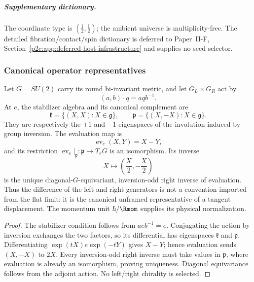 \documentclass[12pt,a4paper]{article}
\begin{document}
\subparagraph{Supplementary dictionary.}
The coordinate type is \((\tfrac12,\tfrac12)\); the ambient universe is
multiplicity-free.  The detailed fibration/contact/spin dictionary is
deferred to Paper~II-F, Section~\ref{p2c:app:deferred-host-infrastructure} and supplies
no seed selector.

\subsubsection{Canonical operator representatives}

\begin{theorem}
\label{p2:thm:canonical-transvection-bridge}
Let \(G=SU(2)\) carry its round bi-invariant metric, and let
\(G_L\times G_R\) act by
\[
        (a,b)\cdot q=aqb^{-1}.
\]
At \(e\), the stabilizer algebra and its canonical complement are
\[
 \mathfrak k=\{(X,X):X\in\mathfrak g\},
 \qquad
 \mathfrak p=\{(X,-X):X\in\mathfrak g\}.
\]
They are respectively the \(+1\) and \(-1\) eigenspaces of the involution
induced by group inversion.  The evaluation map is
\[
        \operatorname{ev}_e(X,Y)=X-Y,
\]
and its restriction \(\operatorname{ev}_e|_{\mathfrak p}:\mathfrak p\to
T_eG\) is an isomorphism.  Its inverse
\[
        X\longmapsto \left(\frac X2,-\frac X2\right)
\]
is the unique diagonal-\(G\)-equivariant, inversion-odd right inverse of
evaluation.  Thus the difference of the left and right generators is not a
convention imported from the flat limit: it is the canonical unframed
representative of a tangent displacement.  The momentum unit
\(\hbar/\Rmom\) supplies its physical normalization.
\end{theorem}

\begin{proof}
The stabilizer condition follows from \(aeb^{-1}=e\).  Conjugating the action
by inversion exchanges the two factors, so its differential has eigenspaces
\(\mathfrak k\) and \(\mathfrak p\).  Differentiating
\(\exp(tX)e\exp(-tY)\) gives \(X-Y\); hence evaluation sends
\((X,-X)\) to \(2X\).  Every inversion-odd right inverse must take values in
\(\mathfrak p\), where evaluation is already an isomorphism, proving
uniqueness.  Diagonal equivariance follows from the adjoint action.  No
left/right chirality is selected.
\end{proof}
\end{document}
